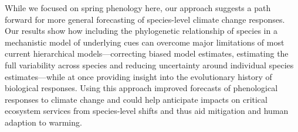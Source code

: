 \documentclass[11pt]{article}
\begin{document}

While we focused on spring phenology here, our approach suggests a path forward for more general forecasting of species-level climate change responses. Our results show how including the phylogenetic relationship of species in a mechanistic model of underlying cues can overcome major limitations of most current hierarchical models---correcting biased model estimates, estimating the full variability across species and reducing uncertainty around individual species estimates---while at once providing insight into the evolutionary history of biological responses. Using this approach improved forecasts of phenological responses to climate change and could help anticipate impacts on critical ecosystem services from species-level shifts and thus aid mitigation and human adaption to warming. %




\clearpage
\end{document}
